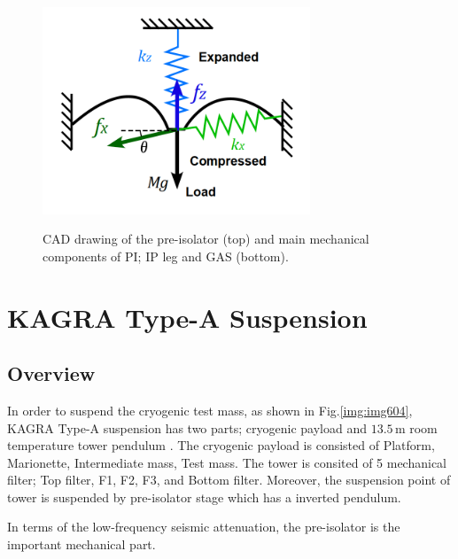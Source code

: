 \begin{figure}[p]
\begin{minipage}[b]{0.5\hsize}
\begin{center}
      \label{img:img603b}
    \end{center}
  \end{minipage}
  \begin{minipage}[b]{0.5\hsize}
    \begin{center}
      \includegraphics[width=8cm]{./img_chap6/img603c.png}
      \label{img:img603b}
    \end{center}
  \end{minipage}  
  \caption{CAD drawing of the pre-isolator (top) and main mechanical components of PI; IP leg and GAS (bottom).}
\end{figure}


\section{KAGRA Type-A Suspension}
\subsection{Overview}
In order to suspend the cryogenic test mass, as shown in Fig.\ref{img:img604}, KAGRA Type-A suspension has two parts; cryogenic payload and $13.5\,\mathrm{m}$ room temperature tower pendulum \cite{Okutomi2019development}. The cryogenic payload is consisted of Platform, Marionette, Intermediate mass, Test mass. The tower is consited of 5 mechanical filter; Top filter, F1, F2, F3, and Bottom filter. Moreover, the suspension point of tower is suspended by pre-isolator stage which has a inverted pendulum.

In terms of the low-frequency seismic attenuation, the pre-isolator is the important mechanical part.




